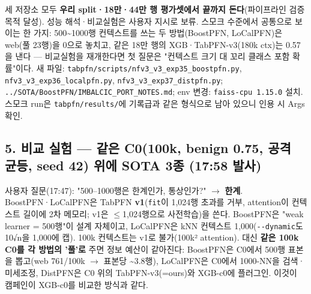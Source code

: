 세 저장소 모두 \textbf{우리 split·18만·44만 행 평가셋에서 끝까지 돈다}(파이프라인 검증 목적 달성). 성능 해석·비교실험은 사용자 지시로 보류. 스모크 수준에서 공통으로 보이는 한 가지: 500\textasciitilde{}1000행 컨텍스트를 쓰는 두 방법(BoostPFN, LoCalPFN)은 web(풀 23행)을 0으로 놓치고, 같은 18만 행의 XGB·TabPFN-v3(180k ctx)는 0.57을 낸다 — 비교실험을 재개한다면 첫 질문은 "컨텍스트 크기 대 꼬리 클래스 포함 확률"이다. 새 파일: \texttt{tabpfn/\allowbreak{}\allowbreak{}s\allowbreak{}cripts/\allowbreak{}\allowbreak{}n\allowbreak{}fv3\_\allowbreak{}\allowbreak{}v3\_\allowbreak{}\allowbreak{}e\allowbreak{}xp35\_\allowbreak{}\allowbreak{}boo\allowbreak{}stpfn.\allowbreak{}py\allowbreak{}}, \texttt{nfv3\_\allowbreak{}\allowbreak{}v3\_\allowbreak{}\allowbreak{}exp36\_\allowbreak{}\allowbreak{}lo\allowbreak{}calpfn.\allowbreak{}p\allowbreak{}y}, \texttt{nfv3\_\allowbreak{}\allowbreak{}v3\_\allowbreak{}\allowbreak{}exp37\_\allowbreak{}\allowbreak{}di\allowbreak{}stpfn.\allowbreak{}py\allowbreak{}}; \texttt{.\allowbreak{}.\allowbreak{}/\allowbreak{}\allowbreak{}SOTA/\allowbreak{}\allowbreak{}BoostPFN\allowbreak{}/\allowbreak{}\allowbreak{}IMBALCI\allowbreak{}C\_\allowbreak{}\allowbreak{}PORT\_\allowbreak{}\allowbreak{}N\allowbreak{}OTES.\allowbreak{}md}; env 변경: \texttt{faiss-\allowbreak{}cp\allowbreak{}u 1.\allowbreak{}15.\allowbreak{}0\allowbreak{}} 설치. 스모크 run은 \texttt{tabpfn/\allowbreak{}\allowbreak{}r\allowbreak{}esults/\allowbreak{}\allowbreak{}}에 기록급과 같은 형식으로 남아 있으니 인용 시 Args 확인.

\subsection{5. 비교 실험 — 같은 C0(100k, benign 0.75, 공격 균등, seed 42) 위에 SOTA 3종 (17:58 발사)}
사용자 질문(17:47): "500–1000행은 한계인가, 통상인가?"  \ensuremath{\rightarrow}  \textbf{한계}. BoostPFN·LoCalPFN은 TabPFN \textbf{v1}(\texttt{fit}이 1,024행 초과를 거부, attention이 컨텍스트 길이에 2차 메모리; v1은 \ensuremath{\leq}1,024행으로 사전학습)을 쓴다. BoostPFN은 "weak learner =\allowbreak{} 500행"이 설계 자체이고, LoCalPFN은 kNN 컨텍스트 1,000(\texttt{-\allowbreak{}-\allowbreak{}dynami\allowbreak{}c}도 10√n을 1,000에 캡). 100k 컨텍스트는 v1로 불가(100k² attention). 대신 \textbf{같은 100k C0를 각 방법의 '풀'로} 주면 정보 예산이 같아진다: BoostPFN은 C0에서 500행 표본을 뽑고(web 761/\allowbreak{}100k  \ensuremath{\rightarrow}  표본당 \textasciitilde{}3.8행), LoCalPFN은 C0에서 1000-NN을 검색·미세조정, DistPFN은 C0 위의 TabPFN-v3(=\allowbreak{}ours)와 XGB-c0에 플러그인. 이것이 캠페인이 XGB-c0를 비교한 방식과 같다.


